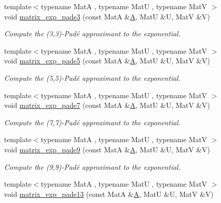 \begin{DoxyCompactItemize}
\item 
{\footnotesize template$<$typename MatA , typename MatU , typename MatV $>$ }\\void \hyperlink{namespace_eigen_1_1internal_a7e6cf2e01b6fb376d33b9bb8183e5777}{matrix\+\_\+exp\+\_\+pade3} (const MatA \&\hyperlink{group___core___module_class_eigen_1_1_matrix}{A}, MatU \&U, MatV \&V)
\begin{DoxyCompactList}\small\item\em Compute the (3,3)-\/\+Pad\'{e} approximant to the exponential. \end{DoxyCompactList}\item 
{\footnotesize template$<$typename MatA , typename MatU , typename MatV $>$ }\\void \hyperlink{namespace_eigen_1_1internal_af4992d182490219270a24aaa8285e63a}{matrix\+\_\+exp\+\_\+pade5} (const MatA \&\hyperlink{group___core___module_class_eigen_1_1_matrix}{A}, MatU \&U, MatV \&V)
\begin{DoxyCompactList}\small\item\em Compute the (5,5)-\/\+Pad\'{e} approximant to the exponential. \end{DoxyCompactList}\item 
{\footnotesize template$<$typename MatA , typename MatU , typename MatV $>$ }\\void \hyperlink{namespace_eigen_1_1internal_a1abecb439e6cb1b5188828cdb7e0ab60}{matrix\+\_\+exp\+\_\+pade7} (const MatA \&\hyperlink{group___core___module_class_eigen_1_1_matrix}{A}, MatU \&U, MatV \&V)
\begin{DoxyCompactList}\small\item\em Compute the (7,7)-\/\+Pad\'{e} approximant to the exponential. \end{DoxyCompactList}\item 
{\footnotesize template$<$typename MatA , typename MatU , typename MatV $>$ }\\void \hyperlink{namespace_eigen_1_1internal_a218447e97bf869bf354f92e020a7355a}{matrix\+\_\+exp\+\_\+pade9} (const MatA \&\hyperlink{group___core___module_class_eigen_1_1_matrix}{A}, MatU \&U, MatV \&V)
\begin{DoxyCompactList}\small\item\em Compute the (9,9)-\/\+Pad\'{e} approximant to the exponential. \end{DoxyCompactList}\item 
{\footnotesize template$<$typename MatA , typename MatU , typename MatV $>$ }\\void \hyperlink{namespace_eigen_1_1internal_ae7d0962a143c96343984440db683905a}{matrix\+\_\+exp\+\_\+pade13} (const MatA \&\hyperlink{group___core___module_class_eigen_1_1_matrix}{A}, MatU \&U, MatV \&V)

\end{DoxyCompactItemize}
